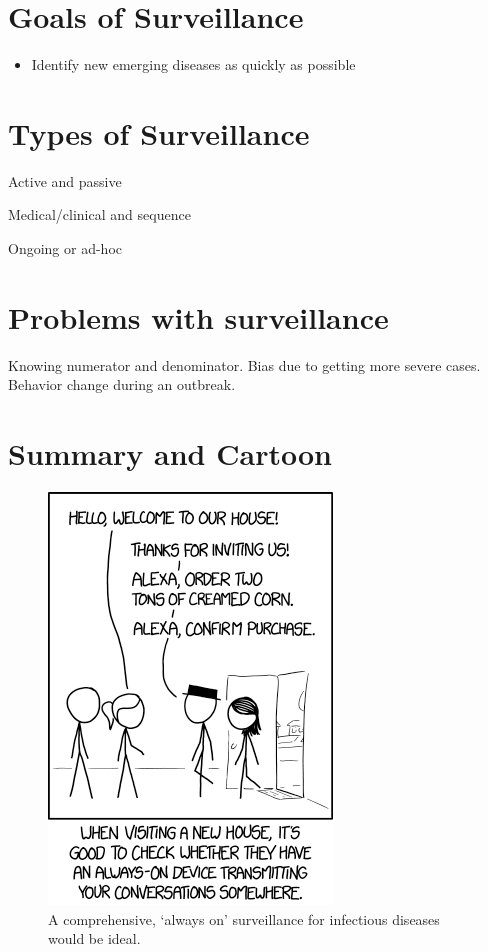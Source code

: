 \documentclass[]{book}
\providecommand{\tightlist}{%
  \setlength{\itemsep}{0pt}\setlength{\parskip}{0pt}}
\theoremstyle{definition}
\theoremstyle{definition}
\theoremstyle{definition}
\theoremstyle{remark}
\begin{document}
\section{Goals of Surveillance}\label{goals-of-surveillance}

\begin{itemize}
\tightlist
\item
  Identify new emerging diseases as quickly as possible
\end{itemize}

\section{Types of Surveillance}\label{types-of-surveillance}

Active and passive

Medical/clinical and sequence

Ongoing or ad-hoc

\section{Problems with surveillance}\label{problems-with-surveillance}

Knowing numerator and denominator. Bias due to getting more severe
cases. Behavior change during an outbreak.

\section{Summary and Cartoon}\label{summary-and-cartoon-9}

\begin{figure}
\centering
\includegraphics{./images/xkcd-listening.png}
\caption{A comprehensive, `always on' surveillance for infectious
diseases would be ideal.}
\end{figure}
\end{document}
